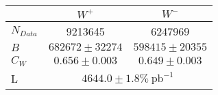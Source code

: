 
        \begin{tabular}{lcc}
      \hline
      \hline
       & $W^+$ & $W^-$ \\
      \hline
      $N_{Data}$       & 9213645                & 6247969  \\
      $B$ & $682672 \pm 32274$ & $598415 \pm 20355$ \\
      $C_W$            & $0.656    \pm 0.003$   & $0.649    \pm 0.003$ \\
      L &  \multicolumn{2}{c}{$4644.0 \pm 1.8 \%\ \mbox{pb}^{-1}$} \\
      \hline
      \hline
    \end{tabular}

    
